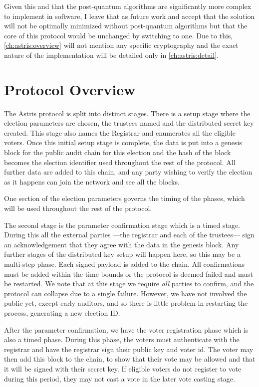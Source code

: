 Given this and that the post-quantum algorithms are significantly more complex to implement in software, I leave that as future work and accept that the solution will not be optimally minimized without post-quantum algorithms but that the core of this protocol would be unchanged by switching to one. Due to this, \autoref{ch:astris:overview} will not mention any specific cryptography and the exact nature of the implementation will be detailed only in \autoref{ch:astris:detail}.

\section{Protocol Overview}
\label{ch:astris:overview}

The Astris protocol is split into distinct stages. There is a setup stage where the election parameters are chosen, the trustees named and the distributed secret key created. This stage also names the Registrar and enumerates all the eligible voters. Once this initial setup stage is complete, the data is put into a genesis block for the public audit chain for this election and the hash of the block becomes the election identifier used throughout the rest of the protocol. All further data are added to this chain, and any party wishing to verify the election as it happens can join the network and see all the blocks.

One section of the election parameters governs the timing of the phases, which will be used throughout the rest of the protocol.

The second stage is the parameter confirmation stage which is a timed stage. During this all the external parties ---the registrar and each of the trustees--- sign an acknowledgement that they agree with the data in the genesis block. Any further stages of the distributed key setup will happen here, so this may be a multi-step phase. Each signed payload is added to the chain. All confirmations must be added within the time bounds or the protocol is deemed failed and must be restarted. We note that at this stage we require \emph{all} parties to confirm, and the protocol can collapse due to a single failure. However, we have not involved the public yet, except early auditors, and so there is little problem in restarting the process, generating a new election ID.

After the parameter confirmation, we have the voter registration phase which is also a timed phase. During this phase, the voters must authenticate with the registrar and have the registrar sign their public key and voter id. The voter may then add this block to the chain, to show that their vote may be allowed and that it will be signed with their secret key. If eligible voters do not register to vote during this period, they may not cast a vote in the later vote casting stage.

